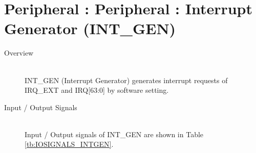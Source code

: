 \section{Peripheral : Peripheral : Interrupt Generator (INT\_GEN)}

\begin{description}

    \item[Overview]\mbox{}\\
        INT\_GEN (Interrupt Generator) generates interrupt requests of IRQ\_EXT and IRQ[63:0] by software setting.
        
    \item[Input / Output Signals]\mbox{}\\
        Input / Output signals of INT\_GEN are shown in Table \ref{tb:IOSIGNALS_INTGEN}.



\end{description}
